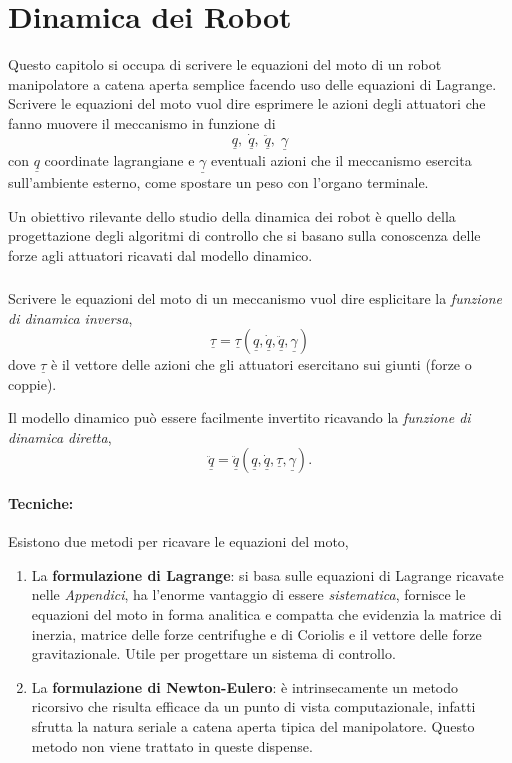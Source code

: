 \chapter{Dinamica dei Robot}
Questo capitolo si occupa di scrivere le equazioni del moto di un robot manipolatore a catena aperta semplice facendo uso delle equazioni di Lagrange. Scrivere le equazioni del moto vuol dire esprimere le azioni degli attuatori che fanno muovere il meccanismo in funzione di
\begin{equation}
	\underline{q}, \; \dot{\underline{q}}, \; \ddot{\underline{q}}, \; \underline{\gamma}
\end{equation}
con $\underline{q}$ coordinate lagrangiane e $\underline{\gamma}$ eventuali azioni che il meccanismo esercita sull'ambiente esterno, come spostare un peso con l'organo terminale.

Un obiettivo rilevante dello studio della dinamica dei robot è quello della progettazione degli algoritmi di controllo che si basano sulla conoscenza delle forze agli attuatori ricavati dal modello dinamico.
\paragraph{}
Scrivere le equazioni del moto di un meccanismo vuol dire esplicitare la \emph{funzione di dinamica inversa},
\begin{equation}
	\underline{\tau} = \underline{\tau}(\underline{q}, \underline{\dot{q}}, \underline{\ddot{q}}, \underline{\gamma})
\end{equation}
dove $\underline{\tau}$ è il vettore delle azioni che gli attuatori esercitano sui giunti (forze o coppie).


Il modello dinamico può essere facilmente invertito ricavando la \emph{funzione di dinamica diretta},
\begin{equation}
	\underline{\ddot{q}} = \underline{\ddot{q}}(\underline{q}, \underline{\dot{q}}, \underline{\tau}, \underline{\gamma}).
\end{equation} 

\subsubsection{Tecniche:}
Esistono due metodi per ricavare le equazioni del moto,
\begin{enumerate}
	\item La \textbf{formulazione di Lagrange}: si basa sulle equazioni di Lagrange ricavate nelle \emph{Appendici}, ha l'enorme vantaggio di essere \emph{sistematica}, fornisce le equazioni del moto in forma analitica e compatta che evidenzia la matrice di inerzia, matrice delle forze centrifughe e di Coriolis e il vettore delle forze gravitazionale. Utile per progettare un sistema di controllo.
	\item La \textbf{formulazione di Newton-Eulero}: è intrinsecamente un metodo ricorsivo che risulta efficace da un punto di vista computazionale, infatti sfrutta la natura seriale a catena aperta tipica del manipolatore. Questo metodo non viene trattato in queste dispense.
\end{enumerate}

